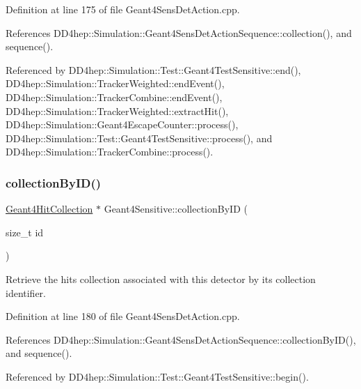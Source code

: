 Definition at line 175 of file Geant4\+Sens\+Det\+Action.\+cpp.



References D\+D4hep\+::\+Simulation\+::\+Geant4\+Sens\+Det\+Action\+Sequence\+::collection(), and sequence().



Referenced by D\+D4hep\+::\+Simulation\+::\+Test\+::\+Geant4\+Test\+Sensitive\+::end(), D\+D4hep\+::\+Simulation\+::\+Tracker\+Weighted\+::end\+Event(), D\+D4hep\+::\+Simulation\+::\+Tracker\+Combine\+::end\+Event(), D\+D4hep\+::\+Simulation\+::\+Tracker\+Weighted\+::extract\+Hit(), D\+D4hep\+::\+Simulation\+::\+Geant4\+Escape\+Counter\+::process(), D\+D4hep\+::\+Simulation\+::\+Test\+::\+Geant4\+Test\+Sensitive\+::process(), and D\+D4hep\+::\+Simulation\+::\+Tracker\+Combine\+::process().

\hypertarget{class_d_d4hep_1_1_simulation_1_1_geant4_sensitive_ad45d2c806dd89d1434ba8eec35b87843}{}\label{class_d_d4hep_1_1_simulation_1_1_geant4_sensitive_ad45d2c806dd89d1434ba8eec35b87843} 
\subsubsection{\texorpdfstring{collection\+By\+I\+D()}{collectionByID()}}
{\footnotesize\ttfamily \hyperlink{class_d_d4hep_1_1_simulation_1_1_geant4_hit_collection}{Geant4\+Hit\+Collection} $\ast$ Geant4\+Sensitive\+::collection\+By\+ID (\begin{DoxyParamCaption}\item[{size\+\_\+t}]{id }\end{DoxyParamCaption})}



Retrieve the hits collection associated with this detector by its collection identifier. 



Definition at line 180 of file Geant4\+Sens\+Det\+Action.\+cpp.



References D\+D4hep\+::\+Simulation\+::\+Geant4\+Sens\+Det\+Action\+Sequence\+::collection\+By\+I\+D(), and sequence().



Referenced by D\+D4hep\+::\+Simulation\+::\+Test\+::\+Geant4\+Test\+Sensitive\+::begin().

